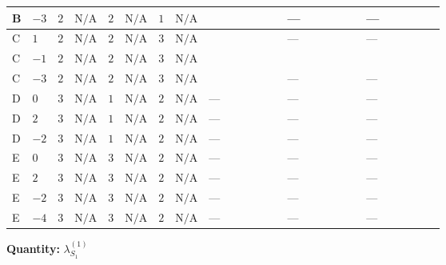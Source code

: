 \documentclass[8pt]{article}
\begin{document}
\begin{landscape}
\begin{longtable}{@{}llcccccc >{\raggedright\arraybackslash}p{0.21\linewidth} >{\raggedright\arraybackslash}p{0.21\linewidth} >{\raggedright\arraybackslash}p{0.21\linewidth}@{}}
\midrule
B & $-3$ & $2$ & $\text{N/A}$ & $2$ & $\text{N/A}$ & $1$ & $\text{N/A}$ & \scriptsize\adjustbox{max width=\linewidth}{$\begin{gathered} +\frac{{\lambda_{HS_1}^{(A)}}^2}{4}\end{gathered}$} & --- & --- \\
\midrule
C & $1$ & $2$ & $\text{N/A}$ & $2$ & $\text{N/A}$ & $3$ & $\text{N/A}$ & \scriptsize\adjustbox{max width=\linewidth}{$\begin{gathered} +\frac{{\lambda_{HS_1}^{(A)}}^2}{4}\end{gathered}$} & --- & --- \\
\midrule
C & $-1$ & $2$ & $\text{N/A}$ & $2$ & $\text{N/A}$ & $3$ & $\text{N/A}$ & \scriptsize\adjustbox{max width=\linewidth}{$\begin{gathered} +\frac{{\lambda_{HS_1}^{(A)}}^2}{4}\end{gathered}$} & \scriptsize\adjustbox{max width=\linewidth}{$\begin{gathered} 8 {\lambda_{7}} \left({\lambda_{7}}\right)^{*}\end{gathered}$} & \scriptsize\adjustbox{max width=\linewidth}{$\begin{gathered} +8 {\lambda_{9}} \left({\lambda_{9}}\right)^{*}\end{gathered}$} \\
\midrule
C & $-3$ & $2$ & $\text{N/A}$ & $2$ & $\text{N/A}$ & $3$ & $\text{N/A}$ & \scriptsize\adjustbox{max width=\linewidth}{$\begin{gathered} +\frac{{\lambda_{HS_1}^{(A)}}^2}{4}\end{gathered}$} & --- & --- \\
\midrule
D & $0$ & $3$ & $\text{N/A}$ & $1$ & $\text{N/A}$ & $2$ & $\text{N/A}$ & --- & --- & --- \\
\midrule
D & $2$ & $3$ & $\text{N/A}$ & $1$ & $\text{N/A}$ & $2$ & $\text{N/A}$ & --- & --- & --- \\
\midrule
D & $-2$ & $3$ & $\text{N/A}$ & $1$ & $\text{N/A}$ & $2$ & $\text{N/A}$ & --- & --- & --- \\
\midrule
E & $0$ & $3$ & $\text{N/A}$ & $3$ & $\text{N/A}$ & $2$ & $\text{N/A}$ & --- & --- & --- \\
\midrule
E & $2$ & $3$ & $\text{N/A}$ & $3$ & $\text{N/A}$ & $2$ & $\text{N/A}$ & --- & --- & --- \\
\midrule
E & $-2$ & $3$ & $\text{N/A}$ & $3$ & $\text{N/A}$ & $2$ & $\text{N/A}$ & --- & --- & --- \\
\midrule
E & $-4$ & $3$ & $\text{N/A}$ & $3$ & $\text{N/A}$ & $2$ & $\text{N/A}$ & --- & --- & --- \\
\midrule
\bottomrule
\end{longtable}
\clearpage
\noindent\textbf{Quantity: }$\lambda_{S_1}^{(1)}$\par\smallskip

\end{landscape}
\end{document}
